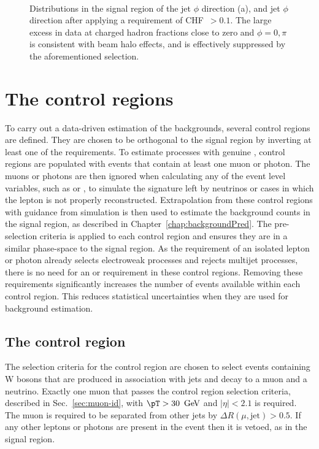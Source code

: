 \begin{figure}[!h]
{ } \\
  \caption{Distributions in the signal region of the jet $\phi$
  direction (a), and jet $\phi$ direction after applying a requirement
  of \ac{CHF}~$>0.1$. The large excess in data at charged hadron
  fractions close to zero and ${\phi = 0, \pi}$ is consistent with
  beam halo effects, and is effectively suppressed by the
  aforementioned selection.}
  \label{fig:leadJetCleaning}
\end{figure}

\section{The control regions}
\label{sec:controlregions}

To carry out a data-driven estimation of the \SM backgrounds, several
control regions are defined. They are chosen to be orthogonal to the
signal region by inverting at least one of the requirements. To estimate
processes with genuine \MET, control regions are populated with events
that contain at least one muon or photon. The muons or photons are then
ignored when calculating any of the event level variables, such as
\alphat or \bdphi, to simulate the signature left by neutrinos or
cases in which the lepton is not properly reconstructed. Extrapolation
from these control regions with guidance from simulation is then used
to estimate the background counts in the signal region, as described
in Chapter~\ref{chap:backgroundPred}. The pre-selection criteria
is applied to each control region and ensures they are in a similar
phase-space to the signal region. As the requirement of an isolated
lepton or photon already selects electroweak processes and rejects
\QCD multijet processes, there is no need for an \alphat or \bdphi
requirement in these control regions. Removing these requirements
significantly increases the number of events available within each
control region. This reduces statistical uncertainties when they are
used for background estimation.

\subsection{The \mj control region}

The selection criteria for the \mj control region are chosen to select
events containing W bosons that are produced in association with
jets and decay to a muon and a neutrino. Exactly one muon that passes
the control region selection criteria, described in Sec.~\ref{sec:muon-id}, with
$\pT>30~\gev$ and $|\eta|<2.1$ is required. The muon is required to be
separated from other jets by $\Delta R(\mu,\mathrm{jet})>0.5$. If any
other leptons or photons are present in the event then it is vetoed, as
in the signal region.

